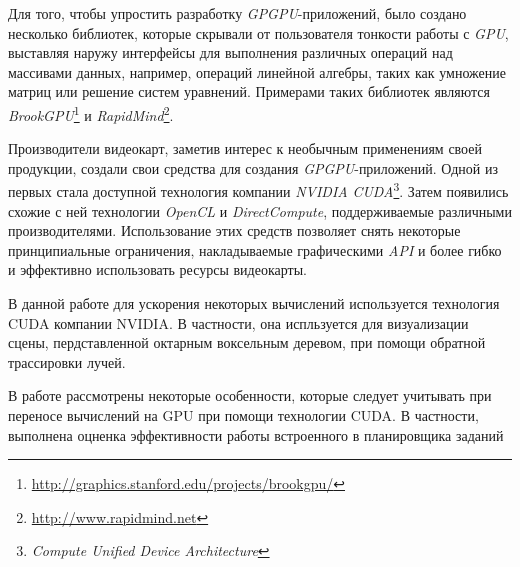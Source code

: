 Для того, чтобы упростить разработку \emph{GPGPU}-приложений, было создано несколько библиотек, которые скрывали от пользователя тонкости работы с \emph{GPU}, выставляя наружу интерфейсы для выполнения различных операций над массивами данных, например, операций линейной алгебры, таких как умножение матриц или решение систем уравнений. Примерами таких библиотек являются \emph{BrookGPU}\footnote{\url{http://graphics.stanford.edu/projects/brookgpu/}} и \emph{RapidMind}\footnote{\url{http://www.rapidmind.net}}.

Производители видеокарт, заметив интерес к необычным применениям своей продукции, создали свои средства для создания \emph{GPGPU}-приложений. Одной из первых стала доступной технология компании \emph{NVIDIA} \emph{CUDA}\footnote{\emph{Compute Unified Device Architecture}}. Затем появились схожие с ней технологии \emph{OpenCL} и \emph{DirectCompute}, поддерживаемые различными производителями. Использование этих средств позволяет снять некоторые принципиальные ограничения, накладываемые графическими \emph{API} и более гибко и эффективно использовать ресурсы видеокарты.

В данной работе для ускорения некоторых вычислений используется технология CUDA компании NVIDIA. В частности, она испльзуется для визуализации сцены, пердставленной октарным воксельным деревом, при помощи обратной трассировки лучей.

В работе рассмотрены некоторые особенности, которые следует учитывать при переносе вычислений на GPU при помощи технологии CUDA. В частности, выполнена оцненка эффективности работы встроенного в планировщика заданий
